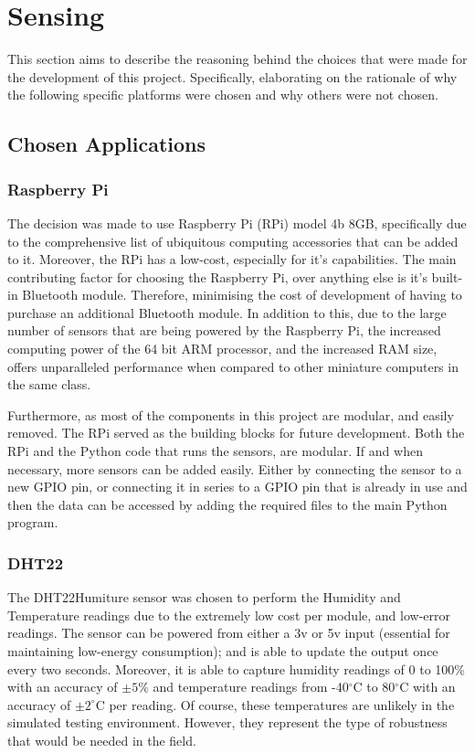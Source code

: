 \documentclass{ueacmpstyle}
\begin{document}
    \section{Sensing} \label{Sec: Sensing}
        This section aims to describe the reasoning behind the choices that were made for the development of this project. Specifically, elaborating on the rationale of why the following specific platforms were chosen and why others were not chosen.
        \subsection{Chosen Applications}
        
            \subsubsection{Raspberry Pi}
            The decision was made to use Raspberry Pi (RPi) model 4b 8GB, specifically due to the comprehensive list of ubiquitous computing accessories that can be added to it. Moreover, the RPi has a low-cost, especially for it's capabilities. The main contributing factor for choosing the Raspberry Pi, over anything else is it's built-in Bluetooth module. Therefore, minimising the cost of development of having to purchase an additional Bluetooth module. In addition to this, due to the large number of sensors that are being powered by the Raspberry Pi, the increased computing power of the 64 bit ARM processor, and the increased RAM size, offers unparalleled performance when compared to other miniature computers in the same class. 
            
            Furthermore, as most of the components in this project are modular, and easily removed. The RPi served as the building blocks for future development. Both the RPi and the Python code that runs the sensors, are modular. If and when necessary, more sensors can be added easily. Either by connecting the sensor to a new GPIO pin, or connecting it in series to a GPIO pin that is already in use and then the data can be accessed by adding the required files to the main Python program.  
            
            \subsubsection{DHT22}
            The DHT22\footnotemark[1] Humiture sensor was chosen to perform the Humidity and Temperature readings due to the extremely low cost per module, and low-error readings. The sensor can be powered from either a 3v or 5v input (essential for maintaining low-energy consumption); and is able to update the output once every two seconds. Moreover, it is able to capture humidity readings of 0 to 100\% with an accuracy of $\pm 5\%$ and temperature readings from -40$^\circ$C to 80$^\circ$C with an accuracy of $\pm 2^\circ$C per reading. Of course, these temperatures are unlikely in the simulated testing environment. However, they represent the type of robustness that would be needed in the field.
        
\end{document}
